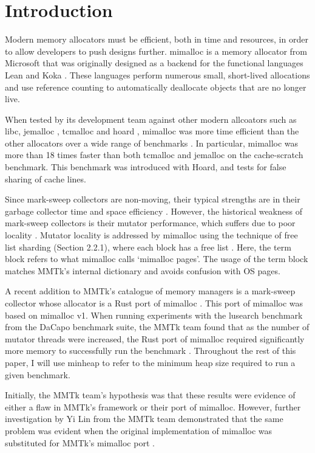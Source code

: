 \documentclass{article}
\begin{document}
\section{Introduction}
Modern memory allocators must be efficient, both in time and resources, in order to allow developers to push designs further. mimalloc is a memory allocator from Microsoft that was originally designed as a backend for the functional languages Lean and Koka \cite{de2015lean,leijen2014koka,leijen2017type,leijen2019mimalloc}. These languages perform numerous small, short-lived allocations and use reference counting to automatically deallocate objects that are no longer live.

When tested by its development team against other modern allcoators such as libc, jemalloc \cite{evans2006scalable}, tcmalloc \cite{tcmalloc} and hoard \cite{berger2000hoard}, mimalloc was more time efficient than the other allocators over a wide range of benchmarks \cite{leijen2019mimalloc}. In particular, mimalloc was more than 18 times faster than both tcmalloc and jemalloc on the cache-scratch benchmark. This benchmark was introduced with Hoard, and tests for false sharing of cache lines.

Since mark-sweep collectors are non-moving, their typical strengths are in their garbage collector time and space efficiency \cite{blackburn2004myths,blackburn2008immix}. However, the historical weakness of mark-sweep collectors is their mutator performance, which suffers due to poor locality \cite{blackburn2008immix}. Mutator locality is addressed by mimalloc using the technique of free list sharding (Section 2.2.1), where each block has a free list \cite{leijen2019mimalloc}. Here, the term block refers to what mimalloc calls `mimalloc pages'. The usage of the term block matches MMTk's internal dictionary and avoids confusion with OS pages.

A recent addition to MMTk's catalogue of memory managers is a mark-sweep collector whose allocator is a Rust port of mimalloc \cite{mmtk-core,pr643}. This port of mimalloc was based on mimalloc v1. When running experiments with the lusearch benchmark from the DaCapo benchmark suite, the MMTk team found that as the number of mutator threads were increased, the Rust port of mimalloc required significantly more memory to successfully run the benchmark \cite{issue-688}. Throughout the rest of this paper, I will use minheap  to refer to the minimum heap size required to run a given benchmark.

Initially, the MMTk team's hypothesis was that these results were evidence of either a flaw in MMTk's framework or their port of mimalloc. However, further investigation by Yi Lin from the MMTk team demonstrated that the same problem was evident when the original implementation of mimalloc was substituted for MMTk's mimalloc port \cite{issue-688}.
\end{document}
